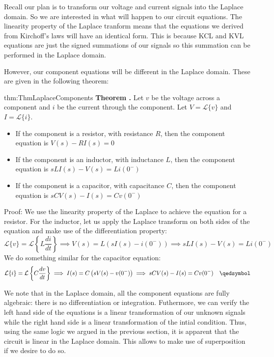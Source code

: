 \documentclass[14pt,a5paper,twoside]{book}
\newenvironment{myTheorem}[2]{ \begin{Theorem}[adjusted title=#1]{}{#2} 
  \textbf{Theorem \thetcbcounter.} \label{#2}}{\end{Theorem}}
\begin{document}
Recall our plan is to transform our voltage and current signals into the Laplace domain. So we are interested in what will happen to our circuit equations. The linearity property of the Laplace tranform means that the equations we derived from Kirchoff's laws will have an identical form. This is because KCL and KVL equations are just the signed summations of our signals so this summation can be performed in the Laplace domain.

However, our component equations will be different in the Laplace domain. These are given in the following theorem:

\begin{myTheorem}{Component Equations in Laplace Domain}{thm:ThmLaplaceComponents}
	Let $v$ be the voltage across a component and $i$ be the current through the component. Let $V = \mathcal{L}\{v\}$ and $I = \mathcal{L}\{i\}$.
	
	\begin{itemize}
		\item{If the component is a resistor, with resistance $R$, then the component equation is $V(s) - RI(s) = 0$}
		\item{If the component is an inductor, with inductance $L$, then the component equation is $sLI(s) - V(s) = Li(0^-)$}
		\item{If the component is a capacitor, with capacitance $C$, then the component equation is $sCV(s) - I(s)= Cv(0^-)$}
	\end{itemize}
\end{myTheorem}
Proof: We use the linearity property of the Laplace to achieve the equation for a resistor. For the inductor, let us apply the Laplace transform on both sides of the equation and make use of the differentiation property:
$$
\mathcal{L}\{v\} = \mathcal{L}\left\{L\frac{di}{dt}\right\} \implies V(s) = L\left( sI(s) - i(0^-)\right) \implies sLI(s) - V(s) = Li(0^-)
$$
We do something similar for the capacitor equation:
$$
\mathcal{L}\{i\} = \mathcal{L}\left\{C\frac{dv}{dt}\right\} \implies I(s) = C\left( sV(s) - v(0^-)\right) \implies sCV(s) - I(s) = Cv(0^-) \quad\qedsymbol
$$

We note that in the Laplace domain, all the component equations are fully algebraic: there is no differentiation or integration. Futhermore, we can verify the left hand side of the equations is a linear transformation of our unknown signals while the right hand side is a linear transformation of the intial condition. Thus, using the same logic we argued in the previous section, it is apparent that the circuit is linear in the Laplace domain. This allows to make use of superposition if we desire to do so.
\end{document}
